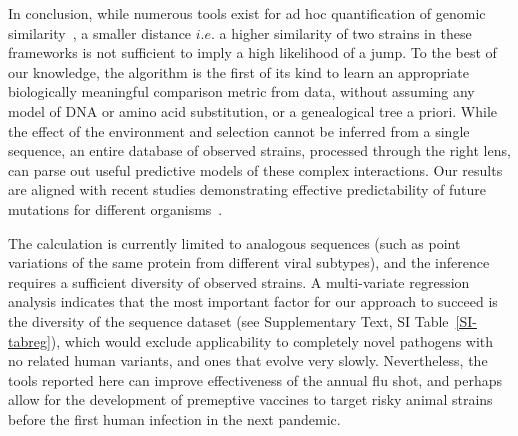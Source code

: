 \documentclass[onecolumn, compsoc,10pt]{IEEEtran}
\begin{document}
In conclusion, while numerous tools exist for ad hoc quantification of genomic similarity~\cite{posada1998modeltest,goldberger2005genomic,huelsenbeck1997phylogeny,neher2014predicting,VanderMeer2010,Smith2009}, a smaller  distance $i.e.$ a higher similarity of two strains in  these frameworks is not sufficient to imply a high likelihood of a jump. %
To the best of our knowledge, the \enet algorithm is  the first of its kind to learn an appropriate biologically meaningful comparison metric from data, without assuming any model of DNA or amino acid substitution, or a genealogical tree a priori. While the effect of the environment and selection cannot be inferred from a single sequence, an entire database of observed strains, processed through the right lens, can parse out useful predictive models of these complex interactions. Our results are  aligned with recent studies demonstrating effective  predictability of  future mutations  for different organisms~\cite{mollentze2021identifying,maher2021predicting}.
   
The \qdist calculation   is currently limited to analogous sequences (such as point variations of the same protein from different viral subtypes), and the \enet inference requires a  sufficient diversity of observed strains. A multi-variate regression analysis indicates  that the most important factor for our approach to succeed is  the diversity of the sequence dataset (see Supplementary Text, SI Table~\ref{SI-tabreg}), which would exclude applicability to completely novel pathogens with no related human variants, and ones that evolve very slowly. Nevertheless, the tools reported here can improve effectiveness of the annual flu shot, and perhaps allow for the development of premeptive vaccines to  target risky animal strains  before the first human infection in the next pandemic.
\end{document}
